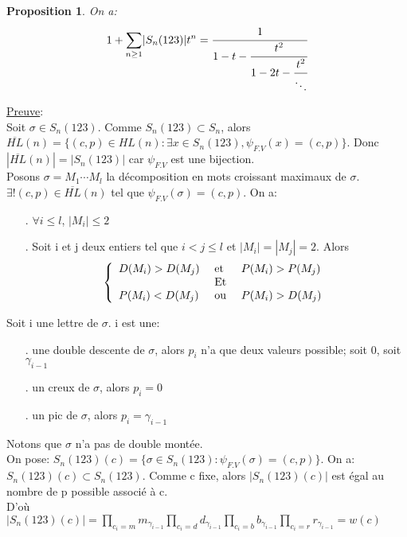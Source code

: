 \documentclass[12pt,a4paper]{extreport}
\newtheorem{proposition}{Proposition}[chapter]
\begin{document}
	\begin{proposition}
		On a: \[
				1 + \underset{n \geq 1}{\sum}|S_{n}(123)|t^n = \cfrac{1}{1-t-\cfrac{t^2}{1-2t-\cfrac{t^2}{\ddots}}}
		\]
	\end{proposition}
	\underline{Preuve}:\\
		Soit $\sigma \in S_{n}(123)$. Comme $S_{n}(123) \subset S_{n} $, alors\\
		$\overline{HL}(n)= \{ (c,p)\in HL(n): \exists x\in S_{n}(123), \psi_{F.V}(x)=(c,p) \}$. 
		Donc $|\overline{HL}(n)| = |S_{n}(123)| $ car $\psi_{F.V}$ est une bijection.\\
		Posons $\sigma = M_{1} \cdots M_{l} $ la décomposition en mots croissant  maximaux de $\sigma$. $\exists! (c,p)\in \overline{HL}(n) $ tel que $\psi_{F.V}(\sigma) = (c,p) $. On a: 
		\begin{itemize}
			\item[.] $\forall i \leq l$, $|M_{i}| \leq  2$
			\item[.]  Soit i et j deux entiers tel que $i<j \leq l$ et $|M_{i}|=|M_{j}|=2$. Alors
			\[
				\left\{
					\begin{array}{l l l}
						D(M_{i}) > D(M_{j}) &\text{ et }& P(M_{i}) > P(M_{j})\\
											&\text{ Et }&\\
						P(M_{i}) < D(M_{j})&\text{ ou }&P(M_{i}) > D(M_{j})

					\end{array}
				\right.
			\]
		\end{itemize}
		Soit i une lettre de $\sigma$. i est une:
		\begin{itemize}
			\item[.] une double descente de $\sigma$, alors $p_{i}$ n'a que deux valeurs possible; soit 0, soit $\gamma_{i-1}$
			\item[.] un creux de $\sigma$, alors $p_{i}=0$
			\item[.] un pic de $\sigma$, alors $p_{i}=\gamma_{i-1}$
		\end{itemize}
		Notons que $\sigma$ n'a pas de double montée.\\
		On pose: $S_{n}(123)(c) = \{ \sigma \in S_{n}(123): \psi_{F.V}(\sigma) = (c,p) \} $. On a: $S_{n}(123)(c) \subset S_{n}(123) $. Comme c fixe, alors $|S_{n}(123)(c)|$ est égal au nombre de p possible associé à c.\\
		D'où $|S_{n}(123)(c)| = \underset{c_{i}=m}{\prod}m_{\gamma_{i-1}} \underset{c_{i}=d}{\prod}d_{\gamma_{i-1}} \underset{c_{i}=b}{\prod}b_{\gamma_{i-1}} \underset{c_{i}=r}{\prod}r_{\gamma_{i-1}} = w(c) $\\
\end{document}
